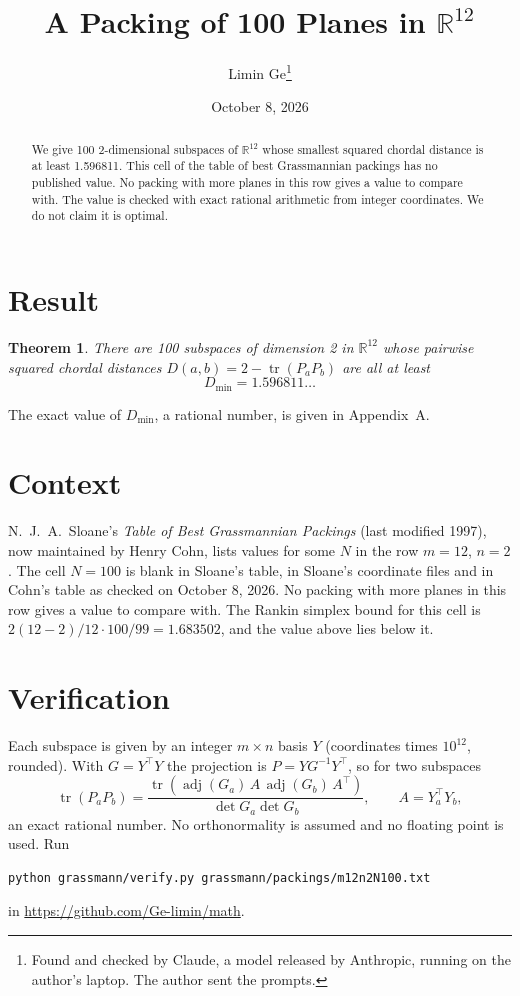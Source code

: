 \documentclass[11pt,a4paper]{article}
\title{A Packing of 100 Planes in $\mathbb{R}^{12}$}
\author{Limin Ge\thanks{Found and checked by Claude, a model released by Anthropic, running on the author's laptop. The author sent the prompts.}}
\date{October 8, 2026}
\newtheorem*{theorem}{Theorem}
\begin{document}
\maketitle
\begin{abstract}
We give 100 2-dimensional subspaces of $\mathbb{R}^{12}$ whose smallest squared chordal distance is at least 1.596811. This cell of the table of best Grassmannian packings has no published value. No packing with more planes in this row gives a value to compare with. The value is checked with exact rational arithmetic from integer coordinates. We do not claim it is optimal.
\end{abstract}

\section{Result}
\begin{theorem}
There are 100 subspaces of dimension 2 in $\mathbb{R}^{12}$ whose pairwise squared chordal distances $D(a,b) = 2 - \operatorname{tr}(P_aP_b)$ are all at least
\[ D_{\min} = 1.596811\ldots \]
\end{theorem}
The exact value of $D_{\min}$, a rational number, is given in Appendix~A.


\section{Context}
N.~J.~A.~Sloane's \emph{Table of Best Grassmannian Packings} (last modified 1997), now maintained by Henry Cohn, lists values for some $N$ in the row $m=12$, $n=2$. The cell $N=100$ is blank in Sloane's table, in Sloane's coordinate files and in Cohn's table as checked on October 8, 2026. No packing with more planes in this row gives a value to compare with. The Rankin simplex bound for this cell is $2(12-2)/12\cdot 100/99 = 1.683502$, and the value above lies below it.


\section{Verification}
Each subspace is given by an integer $m\times n$ basis $Y$ (coordinates times $10^{12}$, rounded). With $G=Y^\top Y$ the projection is $P=YG^{-1}Y^\top$, so for two subspaces
\[ \operatorname{tr}(P_aP_b)=\frac{\operatorname{tr}(\operatorname{adj}(G_a)\,A\,\operatorname{adj}(G_b)\,A^\top)}{\det G_a\det G_b},\qquad A=Y_a^\top Y_b, \]
an exact rational number. No orthonormality is assumed and no floating point is used. Run
\begin{verbatim}
python grassmann/verify.py grassmann/packings/m12n2N100.txt
\end{verbatim}
in \url{https://github.com/Ge-limin/math}.
\end{document}
